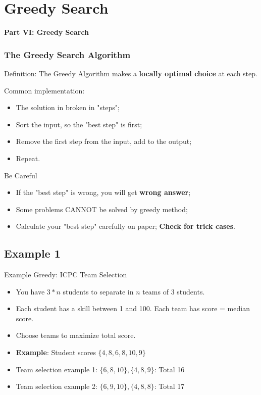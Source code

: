
\section{Greedy Search}
\begin{frame}{}{}
  \begin{center}
    {\bf Part VI: Greedy Search}
  \end{center}
\end{frame}

\begin{frame}
  \frametitle{The Greedy Search Algorithm}

  Definition: The Greedy Algorithm makes a {\bf locally optimal choice} at each step.
  \bigskip

  Common implementation:
  \begin{itemize}
    \item The solution in broken in "steps";
    \item Sort the input, so the "best step" is first;
    \item Remove the first step from the input, add to the output;
    \item Repeat.
  \end{itemize}

  \begin{block}{Be Careful}
    \begin{itemize}
      \item If the "best step" is wrong, you will get {\bf wrong answer};
      \item Some problems CANNOT be solved by greedy method;
      \item Calculate your "best step" carefully on paper; {\bf Check for trick cases}.
    \end{itemize}
  \end{block}

\end{frame}

\subsection{Example 1}
\begin{frame}{Example Greedy: ICPC Team Selection}
  \begin{block}{}
    \begin{itemize}
      \item You have $3*n$ students to separate in $n$ teams of $3$ students.
      \item Each student has a skill between 1 and 100. Each team has score = median score.
      \item Choose teams to maximize total score.
    \end{itemize}
  \end{block}
  \begin{itemize}
    \item {\bf Example}: Student scores $\{4, 8, 6, 8, 10, 9\}$
    \item Team selection example 1: $\{6, 8, 10\}, \{4, 8, 9\}$: Total 16
    \item Team selection example 2: $\{6, 9, 10\}, \{4, 8, 8\}$: Total 17
  \end{itemize}
\end{frame}

